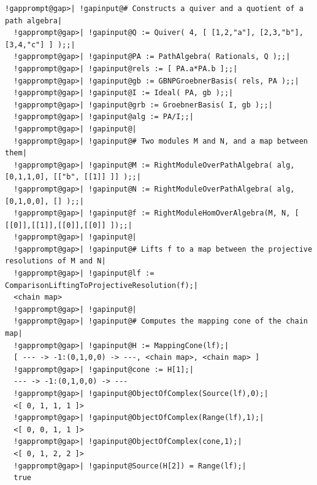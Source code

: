 \documentclass[a4paper,11pt]{report}
\begin{document}
{{ 
\begin{Verbatim}[commandchars=!@|,fontsize=\small,frame=single,label=Example]
  !gapprompt@gap>| !gapinput@# Constructs a quiver and a quotient of a path algebra|
  !gapprompt@gap>| !gapinput@Q := Quiver( 4, [ [1,2,"a"], [2,3,"b"], [3,4,"c"] ] );;|
  !gapprompt@gap>| !gapinput@PA := PathAlgebra( Rationals, Q );;|
  !gapprompt@gap>| !gapinput@rels := [ PA.a*PA.b ];;|
  !gapprompt@gap>| !gapinput@gb := GBNPGroebnerBasis( rels, PA );;|
  !gapprompt@gap>| !gapinput@I := Ideal( PA, gb );;|
  !gapprompt@gap>| !gapinput@grb := GroebnerBasis( I, gb );;|
  !gapprompt@gap>| !gapinput@alg := PA/I;;|
  !gapprompt@gap>| !gapinput@|
  !gapprompt@gap>| !gapinput@# Two modules M and N, and a map between them|
  !gapprompt@gap>| !gapinput@M := RightModuleOverPathAlgebra( alg, [0,1,1,0], [["b", [[1]] ]] );;|
  !gapprompt@gap>| !gapinput@N := RightModuleOverPathAlgebra( alg, [0,1,0,0], [] );;|
  !gapprompt@gap>| !gapinput@f := RightModuleHomOverAlgebra(M, N, [ [[0]],[[1]],[[0]],[[0]] ]);;|
  !gapprompt@gap>| !gapinput@|
  !gapprompt@gap>| !gapinput@# Lifts f to a map between the projective resolutions of M and N|
  !gapprompt@gap>| !gapinput@lf := ComparisonLiftingToProjectiveResolution(f);|
  <chain map>
  !gapprompt@gap>| !gapinput@|
  !gapprompt@gap>| !gapinput@# Computes the mapping cone of the chain map|
  !gapprompt@gap>| !gapinput@H := MappingCone(lf);|
  [ --- -> -1:(0,1,0,0) -> ---, <chain map>, <chain map> ]
  !gapprompt@gap>| !gapinput@cone := H[1];|
  --- -> -1:(0,1,0,0) -> ---
  !gapprompt@gap>| !gapinput@ObjectOfComplex(Source(lf),0);|
  <[ 0, 1, 1, 1 ]>
  !gapprompt@gap>| !gapinput@ObjectOfComplex(Range(lf),1);|
  <[ 0, 0, 1, 1 ]>
  !gapprompt@gap>| !gapinput@ObjectOfComplex(cone,1);|
  <[ 0, 1, 2, 2 ]> 
  !gapprompt@gap>| !gapinput@Source(H[2]) = Range(lf);|
  true
\end{Verbatim}
 }

 }

 
\end{document}
